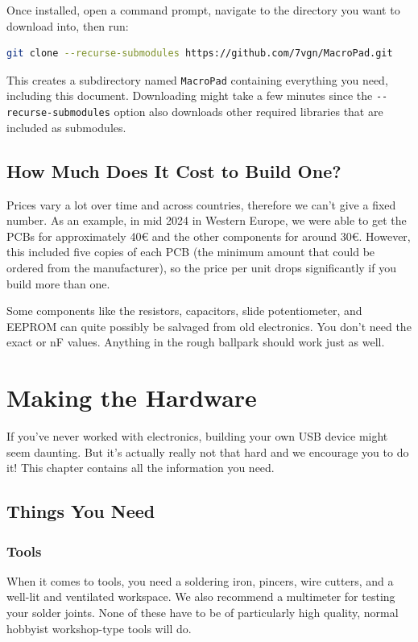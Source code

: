 \documentclass{article}
\newcommand{\file}[1]{\texttt{#1}}
\begin{document}
Once installed, open a command prompt, navigate to the directory you want to download into, then run:
\begin{lstlisting}[language=bash]
git clone --recurse-submodules https://github.com/7vgn/MacroPad.git
\end{lstlisting}
This creates a subdirectory named \file{MacroPad} containing everything you need, including this document.
Downloading might take a few minutes since the \lstinline[language=bash]{--recurse-submodules} option also downloads other required libraries that are included as submodules. 

\subsection{How Much Does It Cost to Build One?}
Prices vary a lot over time and across countries, therefore we can't give a fixed number.
As an example, in mid 2024 in Western Europe, we were able to get the PCBs for approximately 40\euro{} and the other components for around 30\euro{}. However, this included five copies of each PCB (the minimum amount that could be ordered from the manufacturer), so the price per unit drops significantly if you build more than one.

Some components like the resistors, capacitors, slide potentiometer, and EEPROM can quite possibly be salvaged from old electronics.
You don't need the exact \textOmega{} or nF values. Anything in the rough ballpark should work just as well.

\section{Making the Hardware}
If you've never worked with electronics, building your own USB device might seem daunting. But it's actually really not that hard and we encourage you to do it! This chapter contains all the information you need. 

\subsection{Things You Need}
\subsubsection{Tools}
When it comes to tools, you need a soldering iron, pincers, wire cutters, and a well-lit and ventilated workspace. We also recommend a multimeter for testing your solder joints. 
None of these have to be of particularly high quality, normal hobbyist workshop-type tools will do. 
\end{document}
